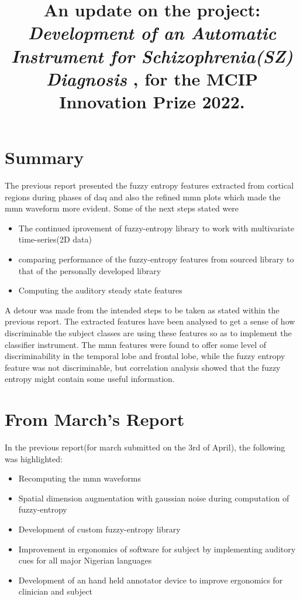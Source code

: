 \documentclass[10pt]{article}
\title{
  An update on the project: 
  \textbf{
      \textit{
        Development of an Automatic Instrument for Schizophrenia(SZ) Diagnosis
        }
      }, for the MCIP Innovation Prize 2022.
  }
\begin{document}
\maketitle

\section{Summary}
The previous report presented the fuzzy entropy features extracted from cortical
regions during phases of \gls{daq} and also the refined \gls{mmn} plots which 
made the \gls{mmn} waveform more evident. Some of the next steps stated were
\begin{itemize}
  \item The continued iprovement of fuzzy-entropy library to work with multivariate \\
  time-series(2D data)
  \item comparing performance of the fuzzy-entropy features from sourced library to \\
  that of the personally developed library
  \item Computing the auditory steady state features
\end{itemize}
A detour was made from the intended steps to be taken as stated within the previous report.
The extracted features have been analysed to get a sense of how discriminable the 
subject classes are using these features so as to implement the classifier instrument. 
The \gls{mmn} features were found to offer some level of discriminability in the 
temporal lobe and frontal lobe, while the fuzzy entropy feature was not discriminable, 
but correlation analysis showed that the fuzzy entropy might contain some useful 
information.

\section{From March's Report}
In the previous report(for march submitted on the 3rd of April), the following was highlighted:
\begin{itemize}
  \item Recomputing the \gls{mmn} waveforms
  \item Spatial dimension augmentation with gaussian noise during computation of fuzzy-entropy
  \item Development of custom fuzzy-entropy library
  \item Improvement in ergonomics of software for subject by implementing auditory cues for all 
  major Nigerian languages
  \item Development of an hand held annotator device to improve ergonomics for clinician and subject
\end{itemize} 
\end{document}
